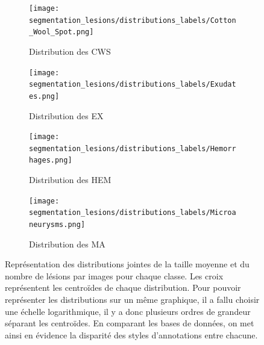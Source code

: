\begin{figure}
	\begin{subfigure}{.5\textwidth}
		\texttt{[image: segmentation\_lesions/distributions\_labels/Cotton\_Wool\_Spot.png]}
		\caption{Distribution des \ac{CWS}}
	\end{subfigure}
	\begin{subfigure}{.5\textwidth}
		\texttt{[image: segmentation\_lesions/distributions\_labels/Exudates.png]}
		\caption{Distribution des \ac{EX}}
	\end{subfigure}
	\begin{subfigure}{.5\textwidth}
		\texttt{[image: segmentation\_lesions/distributions\_labels/Hemorrhages.png]}
		\caption{Distribution des \ac{HEM}}
	\end{subfigure}
	\begin{subfigure}{.5\textwidth}
		\texttt{[image: segmentation\_lesions/distributions\_labels/Microaneurysms.png]}
		\caption{Distribution des \ac{MA}}
	\end{subfigure}
\caption{Représentation des distributions jointes de la taille moyenne et du nombre de lésions par images pour chaque classe. Les croix représentent les centroïdes de chaque distribution. Pour pouvoir représenter les distributions sur un même graphique, il a fallu choisir une échelle logarithmique, il y a donc plusieurs ordres de grandeur séparant les centroïdes.  En comparant les bases de données, on met ainsi en évidence la disparité des styles d'annotations entre chacune.}
\label{fig:jointDistributionLesion}
\end{figure}



